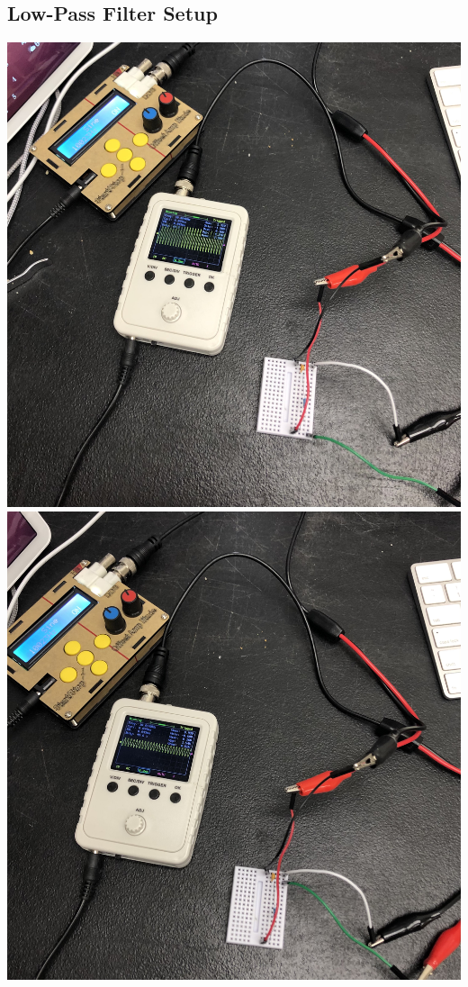 \documentclass{article}
\begin{document}
\begin{center}
  \subsection*{Low-Pass Filter Setup}
  \includegraphics[scale=0.06]{Vcr.jpeg}
  \includegraphics[scale=0.06]{Vc.jpeg}
\end{center}
\end{document}
